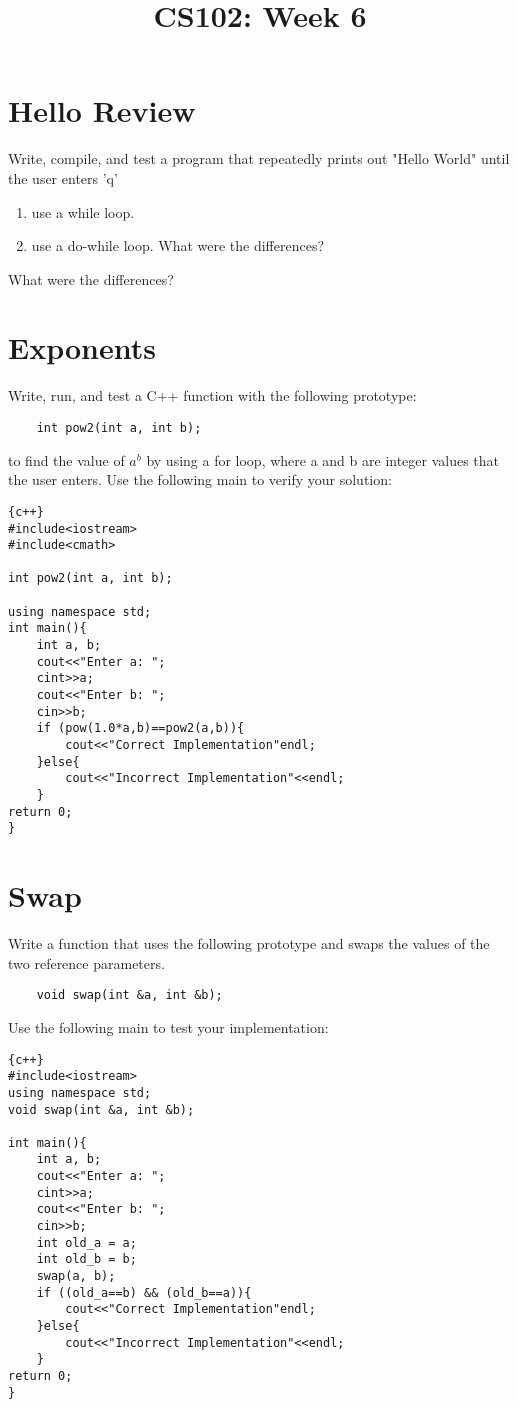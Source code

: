\documentclass{article}
\begin{document}
\title{CS102: Week 6}

\maketitle

\section*{Hello Review}
Write, compile, and test a program that repeatedly prints out "Hello World" until the user enters 'q'
\begin{enumerate}
	\item use a while loop.
	\item use a do-while loop. What were the differences?
\end{enumerate}
 What were the differences?

\section*{Exponents}
Write, run, and test a C++ function with the following prototype:
\begin{lstlisting}
	int pow2(int a, int b);
\end{lstlisting}
to find the value of $a^{b}$  by using a for loop, where a and b are integer values that the user enters. Use the following main to verify your solution:
\begin{lstlisting}{c++}
#include<iostream>
#include<cmath>

int pow2(int a, int b);

using namespace std;
int main(){
	int a, b;
	cout<<"Enter a: ";
	cint>>a;
	cout<<"Enter b: ";
	cin>>b;
	if (pow(1.0*a,b)==pow2(a,b)){
		cout<<"Correct Implementation"endl;
	}else{
		cout<<"Incorrect Implementation"<<endl;
	}
return 0;
}
\end{lstlisting}
\pagebreak
\section*{Swap}
Write a function that uses the following prototype and swaps the values of the two reference parameters.
\begin{lstlisting}
	void swap(int &a, int &b);
\end{lstlisting}
Use the following main to test your implementation:
\begin{lstlisting}{c++}
#include<iostream>
using namespace std;
void swap(int &a, int &b);

int main(){
	int a, b;
	cout<<"Enter a: ";
	cint>>a;
	cout<<"Enter b: ";
	cin>>b;
	int old_a = a;
	int old_b = b;
	swap(a, b);
	if ((old_a==b) && (old_b==a)){
		cout<<"Correct Implementation"endl;
	}else{
		cout<<"Incorrect Implementation"<<endl;
	}
return 0;
}
\end{lstlisting}
\end{document}
